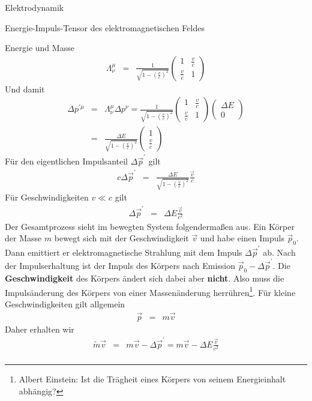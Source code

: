 \begin{chapter}{\titlestr}
\begin{section}{Elektrodynamik}
\begin{subsection}{Energie-Impuls-Tensor des elektromagnetischen Feldes}
\begin{subsubsection}{Energie und Masse}
\begin{eqnarray*}
\Lambda^\mu_\nu &=& \frac{1}{\sqrt{1-\left(\frac{v}{c}\right)^2}}\begin{pmatrix}
1 & \frac{v}{c}\\
\frac{v}{c} & 1
\end{pmatrix}
\end{eqnarray*}
Und damit
\begin{eqnarray*}
\Delta p^{\prime\mu} &=& \Lambda^\mu_\nu\Delta p^\nu = \frac{1}{\sqrt{1-\left(\frac{v}{c}\right)^2}}\begin{pmatrix}
1 & \frac{v}{c}\\
\frac{v}{c} & 1
\end{pmatrix}
\begin{pmatrix}
\Delta E\\
0
\end{pmatrix}\\
&=& \frac{\Delta E}{\sqrt{1-\left(\frac{v}{c}\right)^2}}\begin{pmatrix}
1 \\
\frac{v}{c}
\end{pmatrix}
\end{eqnarray*}
Für den eigentlichen Impulsanteil $\Delta \vec{p}^\prime$ gilt
\begin{eqnarray*}
c\Delta \vec{p}^\prime &=& 
\frac{\Delta E}{\sqrt{1-\left(\frac{v}{c}\right)^2}}\frac{\vec{v}}{c}
\end{eqnarray*}
Für Geschwindigkeiten $v\ll c$ gilt
\begin{eqnarray*}
\Delta \vec{p}^\prime &=& \Delta E\frac{\vec{v}}{c^2}
\end{eqnarray*}
Der Gesamtprozess sieht im bewegten System folgendermaßen aus. Ein Körper der Masse $m$ bewegt sich mit der Geschwindigkeit $\vec{v}$
und habe einen Impuls $\vec{p}_0$. Dann emittiert er elektromagnetische Strahlung mit dem Impuls $\Delta \vec{p}^\prime$ ab.
Nach der Impulserhaltung ist der Impuls des Körpers nach Emission $\vec{p}_0-\Delta \vec{p}^\prime$.
Die \textbf{Geschwindigkeit} des Körpers ändert sich dabei aber \textbf{nicht}. Also muss die Impulsänderung des Körpers von einer Massenänderung herrühren\footnote{\label{einstein_emcsqr}Albert Einstein: Ist die Trägheit eines Körpers von seinem Energieinhalt abhängig?}. Für kleine Geschwindigkeiten gilt allgemein
\begin{eqnarray*}
\vec{p} &=& m\vec{v}
\end{eqnarray*}
Daher erhalten wir 
\begin{eqnarray*}
\tilde{m}\vec{v} &=& m\vec{v}-\Delta \vec{p}^\prime = m\vec{v}-\Delta E\frac{\vec{v}}{c^2}\\

\end{eqnarray*}
\end{subsubsection}
\end{subsection}
\end{section}
\end{chapter}
